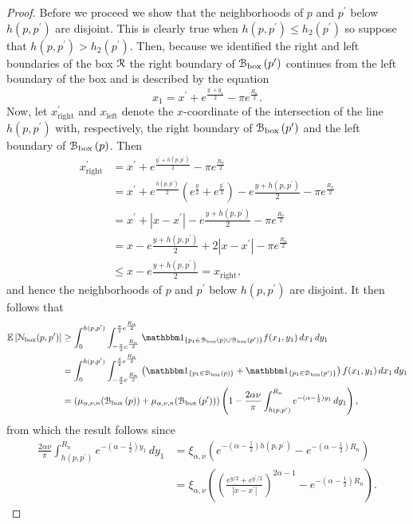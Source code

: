 \begin{proof}
Before we proceed we show that the neighborhoods of $p$ and $p^\prime$ below $h(p,p^\prime)$ are disjoint. This is clearly true when $h(p,p^\prime) \le h_2(p^\prime)$ so suppose that $h(p,p^\prime) > h_2(p^\prime)$. Then, because we identified the right and left boundaries of the box ${\mathcal R}$ the right boundary of ${\mathcal B}_{\text{box}}\left(p^\prime\right)$ continues from the left boundary of the box and is described by the equation
\[
	x_1 = x^\prime + e^{\frac{y^\prime + y_1}{2}} - \pi e^{\frac{R_n}{2}}.
\]
Now, let $x_{\mathrm{right}}^\prime$ and $x_{\mathrm{left}}$ denote the $x$-coordinate of the intersection of the line $h(p,p^\prime)$ with, respectively, the right boundary of ${\mathcal B}_{\text{box}}\left(p^\prime\right)$ and the left boundary of ${\mathcal B}_{\text{box}}\left(p\right)$. Then
\begin{align*}
	x_{\mathrm{right}}^\prime &= x^\prime + e^{\frac{y^\prime + h(p,p^\prime)}{2}} - \pi e^{\frac{R_n}{2}}\\
	&= x^\prime + e^{\frac{h(p,p^\prime)}{2}}\left(e^{\frac{y}{2}} + e^{\frac{y^\prime}{2}}\right)
		- e{\frac{y + h(p,p^\prime)}{2}} - \pi e^{\frac{R_n}{2}}\\
	&= x^\prime + |x - x^\prime| - e{\frac{y + h(p,p^\prime)}{2}} - \pi e^{\frac{R_n}{2}}\\
	&= x - e{\frac{y + h(p,p^\prime)}{2}} + 2|x - x^\prime| - \pi e^{\frac{R_n}{2}}\\
	&\le x - e{\frac{y + h(p,p^\prime)}{2}} = x_{\mathrm{right}},
\end{align*}
and hence the neighborhoods of $p$ and $p^\prime$ below $h(p,p^\prime)$ are disjoint. It then follows that
\begin{align*}
	\Exp{\Ncal_{\text{box}}(p,p^\prime)} 
	&\ge \int_0^{h(p,p^\prime)} \int_{-\frac{\pi}{2}e^{\frac{R_n}{2}}}^{\frac{\pi}{2}e^{\frac{R_n}{2}}} 
		\ind{p_1 \in \BallPon{p} \cup \BallPon{p^\prime}} f(x_1,y_1) \, dx_1 \, dy_1\\
	&= \int_0^{h(p,p^\prime)} \int_{-\frac{\pi}{2}e^{\frac{R_n}{2}}}^{\frac{\pi}{2}e^{\frac{R_n}{2}}} 
		\left(\ind{p_1 \in \BallPon{p}} + \ind{p_1 \in \BallPon{p^\prime}}\right) 
		f(x_1,y_1) \, dx_1 \, dy_1\\
	&= \left(\mu_{\alpha,\nu ,n}(\BallPon{p}) + \mu_{\alpha,\nu ,n}(\BallPon{p^\prime})\right)
		\left(1 - \frac{2\alpha \nu}{\pi}\int_{h(p,p^\prime)}^{R_n} e^{-(\alpha - \frac{1}{2})y_1} \, dy_1\right),
\end{align*}
from which the result follows since
\begin{align*}
	\frac{2\alpha \nu}{\pi}\int_{h(p,p^\prime)}^{R_n} e^{-(\alpha - \frac{1}{2})y_1} \, dy_1 
	&= \xi_{\alpha, \nu}\left(e^{-(\alpha - \frac{1}{2})h(p,p^\prime)} - e^{-(\alpha - \frac{1}{2})R_n}\right)\\
	&= \xi_{\alpha, \nu}\left(\left(\frac{e^{y/2} + e^{y^\prime/2}}{|x-x^\prime|}\right)^{2\alpha - 1}
		- e^{-(\alpha - \frac{1}{2})R_n}\right).
\end{align*}
\end{proof}

